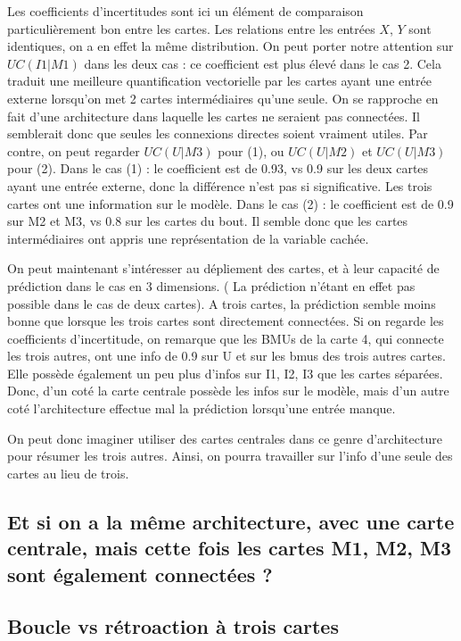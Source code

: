 Les coefficients d'incertitudes sont ici un élément de comparaison particulièrement bon entre les cartes. Les relations entre les entrées $X$, $Y$ sont identiques, on a en effet la même distribution. 
On peut porter notre attention sur $UC(I1|M1)$ dans les deux cas : ce coefficient est plus élevé dans le cas 2.
Cela traduit une meilleure quantification vectorielle par les cartes ayant une entrée externe lorsqu'on met 2 cartes intermédiaires qu'une seule. On se rapproche en fait d'une architecture dans laquelle les cartes ne seraient pas connectées. Il semblerait donc que seules les connexions directes soient vraiment utiles. 
Par contre, on peut regarder $UC(U|M3)$ pour (1), ou $UC(U|M2)$ et $UC(U|M3)$ pour (2). 
Dans le cas (1) : le coefficient est de 0.93, vs 0.9 sur les deux cartes ayant une entrée externe, donc la différence n'est pas si significative. Les trois cartes ont une information sur le modèle.
Dans le cas (2) : le coefficient est de 0.9 sur M2 et M3, vs 0.8 sur les cartes du bout. Il semble donc que les cartes intermédiaires ont appris une représentation de la variable cachée.

On peut maintenant s'intéresser au dépliement des cartes, et à leur capacité de prédiction dans le cas en 3 dimensions. ( La prédiction n'étant en effet pas possible dans le cas de deux cartes). A trois cartes, la prédiction semble moins bonne que lorsque les trois cartes sont directement connectées. 
Si on regarde les coefficients d'incertitude, on remarque que les BMUs de la carte 4, qui connecte les trois autres, ont une info de 0.9 sur U et sur les bmus des trois autres cartes. Elle possède également un peu plus d'infos sur I1, I2, I3 que les cartes séparées. 
Donc, d'un coté la carte centrale possède les infos sur le modèle, mais d'un autre coté l'architecture effectue mal la prédiction lorsqu'une entrée manque. 

On peut donc imaginer utiliser des cartes centrales dans ce genre d'architecture pour résumer les trois autres. Ainsi, on pourra travailler sur l'info d'une seule des cartes au lieu de trois.

\subsection{Et si on a la même architecture, avec une carte centrale, mais cette fois les cartes M1, M2, M3 sont également connectées ?}




\subsection{Boucle vs rétroaction à trois cartes}

